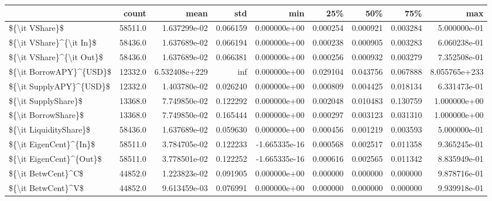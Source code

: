 \begin{tabular}{lrrrrrrrr}
\toprule
{} &    count &           mean &       std &           min &       25\% &       50\% &       75\% &            max \\
\midrule
\$\{\textbackslash it VShare\}\$           &  58511.0 &   1.637299e-02 &  0.066159 &  0.000000e+00 &  0.000254 &  0.000921 &  0.003284 &   5.000000e-01 \\
\$\{\textbackslash it VShare\}\textasciicircum \{\textbackslash it In\}\$  &  58436.0 &   1.637689e-02 &  0.066194 &  0.000000e+00 &  0.000238 &  0.000905 &  0.003283 &   6.060238e-01 \\
\$\{\textbackslash it VShare\}\textasciicircum \{\textbackslash it Out\}\$ &  58436.0 &   1.637689e-02 &  0.066381 &  0.000000e+00 &  0.000256 &  0.000932 &  0.003279 &   7.352508e-01 \\
\$\{\textbackslash it BorrowAPY\}\textasciicircum \{USD\}\$  &  12332.0 &  6.532408e+229 &       inf &  0.000000e+00 &  0.029104 &  0.043756 &  0.067888 &  8.055765e+233 \\
\$\{\textbackslash it SupplyAPY\}\textasciicircum \{USD\}\$  &  12332.0 &   1.403780e-02 &  0.026240 &  0.000000e+00 &  0.000809 &  0.004425 &  0.018134 &   6.331473e-01 \\
\$\{\textbackslash it SupplyShare\}\$      &  13368.0 &   7.749850e-02 &  0.122292 &  0.000000e+00 &  0.002048 &  0.010483 &  0.130759 &   1.000000e+00 \\
\$\{\textbackslash it BorrowShare\}\$      &  13368.0 &   7.749850e-02 &  0.165444 &  0.000000e+00 &  0.000297 &  0.003123 &  0.031310 &   1.000000e+00 \\
\$\{\textbackslash it LiquidityShare\}\$   &  58436.0 &   1.637689e-02 &  0.059630 &  0.000000e+00 &  0.000456 &  0.001219 &  0.003593 &   5.000000e-01 \\
\$\{\textbackslash it EigenCent\}\textasciicircum \{In\}\$   &  58511.0 &   3.784705e-02 &  0.122233 & -1.665335e-16 &  0.000568 &  0.002517 &  0.011358 &   9.365245e-01 \\
\$\{\textbackslash it EigenCent\}\textasciicircum \{Out\}\$  &  58511.0 &   3.778501e-02 &  0.122252 & -1.665335e-16 &  0.000616 &  0.002565 &  0.011342 &   8.835949e-01 \\
\$\{\textbackslash it BetwCent\}\textasciicircum C\$       &  44852.0 &   1.223823e-02 &  0.091905 &  0.000000e+00 &  0.000000 &  0.000000 &  0.000000 &   9.878716e-01 \\
\$\{\textbackslash it BetwCent\}\textasciicircum V\$       &  44852.0 &   9.613459e-03 &  0.076991 &  0.000000e+00 &  0.000000 &  0.000000 &  0.000000 &   9.939918e-01 \\

\end{tabular}
